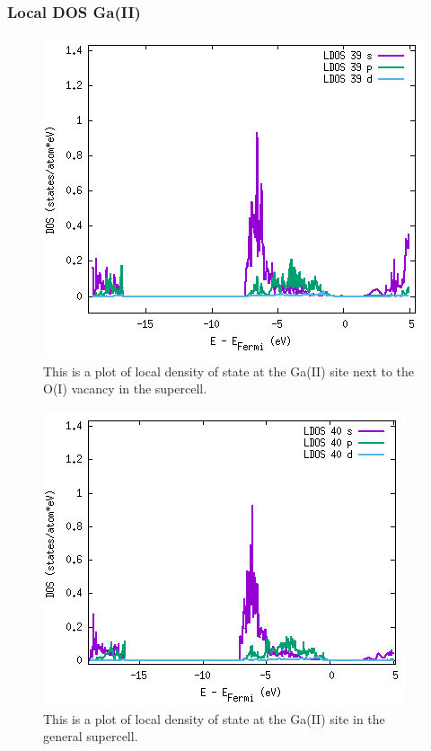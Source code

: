 \subsubsection{Local DOS Ga(II)}



\begin{figure}[H]
\includegraphics[width=\linewidth]{../fig/dosplot/ldos_Ga_II_OI_vac_nabo}\caption{This is a plot of local density of state at the Ga(II) site next to the O(I) vacancy in the supercell.}\label{fig:ldos_Ga_II_nabo}
\end{figure}

\begin{figure}[H]
\includegraphics[width=\linewidth]{../fig/dosplot/ldos_Ga_II_supercell}\caption{This is a plot of local density of state at the Ga(II) site in the general supercell.}\label{fig:ldos_Ga_II_supercell}
\end{figure}

